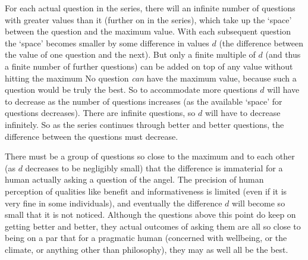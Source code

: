 For each actual question in the series, there will an infinite number of questions with greater values than it (further on in the series), which take up the `space' between the question and the maximum value.
With each subsequent question the `space' becomes smaller by some difference in values $d$ (the difference between the value of one question and the next).
But only a finite multiple of $d$ (and thus a finite number of further questions) can be added on top of any value without hitting the maximum
No question \emph{can} have the maximum value, because such a question would be truly the best.
So to accommodate more questions $d$ will have to decrease as the number of questions increases (as the available `space' for questions decreases).
There are infinite questions, so $d$ will have to decrease infinitely.
So as the series continues through better and better questions, the difference between the questions must decrease.




There must be a group of questions so close to the maximum and to each other (as $d$ decreases to be negligibly small) that the difference is immaterial for a human actually asking a question of the angel.
The precision of human perception of qualities like benefit and informativeness is limited (even if it is very fine in some individuals), and eventually the difference $d$ will become so small that it is not noticed.
Although the questions above this point do keep on getting better and better, they actual outcomes of asking them are all so close to being on a par that for a pragmatic human (concerned with wellbeing, or the climate, or anything other than philosophy), they may as well all be the best.

